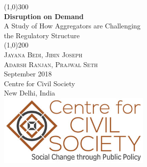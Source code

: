 \documentclass[a4paper, 12pt]{article}
\begin{document}
                    
                    \begin{titlepage}
                    	\begin{center}
                    	\line(1,0){300}\\
                    	[0.25in]
                    	\huge{\bfseries \textcolor{CCSbrown} {Disruption on Demand}} \\
    	[0.5cm]
    	\large  {A Study of How Aggregators are Challenging \\ the Regulatory Structure} \\
    	
                    	\line(1,0){200}\\
                    	[1in]
                    	\textsc{\huge Jayana Bedi, Jibin Joseph \\ Adarsh Ranjan, Prajwal Seth} \\
                    	[1.5cm]
                    	{\Large September 2018} \\
                    	[2.0cm]
                    	{\LARGE Centre for Civil Society} \\
                    	[0.1mm]
                    	{\Large New Delhi, India} \\
    	[2.0cm]
    	 \includegraphics[width = 75mm]{CCSlogo.jpg}
      
                    	\end{center}
                    \end{titlepage}
                    \tableofcontents
                    
      
                    
                    \newpage
\end{document}
